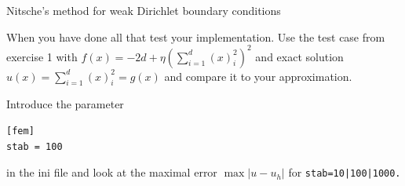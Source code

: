 \documentclass[12pt,a4paper]{article}
\begin{document}
\begin{Exercise}{Nitsche's method for weak Dirichlet boundary
    conditions}
\begin{itemize}
  \end{itemize}

  When you have done all that test your implementation.  Use the test
  case from exercise 1 with $f(x)=-2d+\eta(\sum_{i=1}^d(x)_i^2)^2$ and
  exact solution $u(x)=\sum_{i=1}^d(x)_i^2=g(x)$ and compare it to
  your approximation.

  Introduce the parameter
  \begin{lstlisting}
[fem]
stab = 100
  \end{lstlisting}
  in the ini file and look at the maximal error $\max|u-u_h|$ for
  \lstinline{stab=10|100|1000.}
\end{Exercise}
\end{document}
